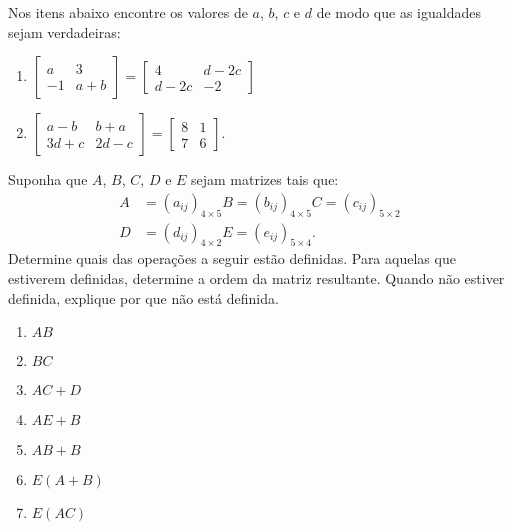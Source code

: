 \documentclass[12pt]{exam}
\begin{document}
    \questao{}\label{igualdade_de_matrizes} Nos itens abaixo encontre os valores de $a$, $b$, $c$ e $d$ de modo que as igualdades sejam verdadeiras:
    \begin{enumerate}
        \item $\begin{bmatrix}a & 3\\-1 & a + b\end{bmatrix} = \begin{bmatrix}4 & d - 2c\\d - 2c & -2\end{bmatrix}$
        \item $\begin{bmatrix}a - b & b + a\\3d + c & 2d - c\end{bmatrix} = \begin{bmatrix}8 & 1\\7 & 6\end{bmatrix}$.
    \end{enumerate}

    \vspace{.3cm}

    \questao{} Suponha que $A$, $B$, $C$, $D$ e $E$ sejam matrizes tais que:
    \begin{align*}
        A &= (a_{ij})_{4 \times 5}
        B = (b_{ij})_{4 \times 5}
        C = (c_{ij})_{5 \times 2}\\
        D &= (d_{ij})_{4 \times 2}
        E = (e_{ij})_{5 \times 4}.
    \end{align*}
    Determine quais das operações a seguir estão definidas. Para aquelas que estiverem definidas, determine a ordem da matriz resultante. Quando não estiver definida, explique por que não está definida.
    \begin{multicols}{2}
        \begin{enumerate}[label={\arabic*})]
            \item $AB$

            \item $BC$

            \item $AC + D$

            \item $AE + B$

            \item $AB + B$

            \item $E(A + B)$

            \item $E(AC)$

        \end{enumerate}
    \end{multicols}
\end{document}
